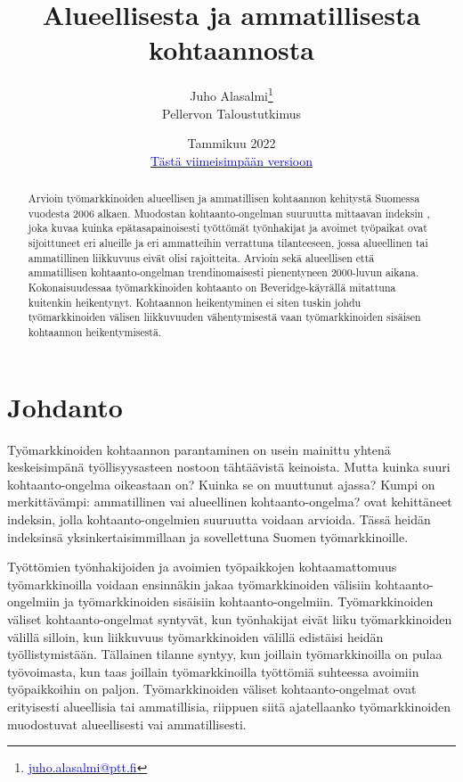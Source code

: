 \documentclass[12pt]{article}
\title{Alueellisesta ja ammatillisesta kohtaannosta}
\date{Tammikuu 2022 \\ 
\href{https://github.com/pttry/kohtaantoindeksit/blob/main/text/kohtaantoindeksit.pdf}{\textcolor{blue}{Tästä viimeisimpään versioon}}}
\author{Juho Alasalmi\footnote{\href{mailto: juho.alasalmi@ptt.fi}{\textcolor{blue}{juho.alasalmi@ptt.fi}}} \\ 
Pellervon Taloustutkimus }
\begin{document}
\maketitle

\begin{abstract}
Arvioin työmarkkinoiden alueellisen ja ammatillisen kohtaannon kehitystä Suomessa vuodesta 2006 alkaen. Muodostan kohtaanto-ongelman suuruutta mittaavan indeksin \cite{csahin2014mismatch}, joka kuvaa kuinka epätasapainoisesti työttömät työnhakijat ja avoimet työpaikat ovat sijoittuneet eri alueille ja eri ammatteihin verrattuna tilanteeseen, jossa alueellinen tai ammatillinen liikkuvuus eivät olisi rajoitteita. Arvioin sekä alueellisen että ammatillisen kohtaanto-ongelman trendinomaisesti pienentyneen 2000-luvun aikana. Kokonaisuudessaa työmarkkinoiden kohtaanto on Beveridge-käyrällä mitattuna kuitenkin heikentynyt. Kohtaannon heikentyminen ei siten tuskin johdu työmarkkinoiden välisen liikkuvuuden vähentymisestä vaan työmarkkinoiden sisäisen kohtaannon heikentymisestä.
\end{abstract}



\section{Johdanto} \label{section:johdanto}

Työmarkkinoiden kohtaannon parantaminen on usein mainittu yhtenä keskeisimpänä työllisyysasteen nostoon tähtäävistä keinoista. Mutta kuinka suuri kohtaanto-ongelma oikeastaan on? Kuinka se on muuttunut ajassa? Kumpi on merkittävämpi: ammatillinen vai alueellinen kohtaanto-ongelma?  ovat kehittäneet indeksin, jolla kohtaanto-ongelmien suuruutta voidaan arvioida. Tässä heidän indeksinsä yksinkertaisimmillaan ja sovellettuna Suomen työmarkkinoille.

Työttömien työnhakijoiden ja avoimien työpaikkojen kohtaamattomuus työmarkkinoilla voidaan ensinnäkin jakaa työmarkkinoiden välisiin kohtaanto-ongelmiin ja työmarkkinoiden sisäisiin kohtaanto-ongelmiin. Työmarkkinoiden väliset kohtaanto-ongelmat syntyvät, kun työnhakijat eivät liiku työmarkkinoiden välillä silloin, kun liikkuvuus työmarkkinoiden välillä edistäisi heidän työllistymistään. Tällainen tilanne syntyy, kun joillain työmarkkinoilla on pulaa työvoimasta, kun taas joillain työmarkkinoilla työttömiä suhteessa avoimiin työpaikkoihin on paljon. Työmarkkinoiden väliset kohtaanto-ongelmat ovat erityisesti alueellisia tai ammatillisia, riippuen siitä ajatellaanko työmarkkinoiden muodostuvat alueellisesti vai ammatillisesti.
\end{document}
